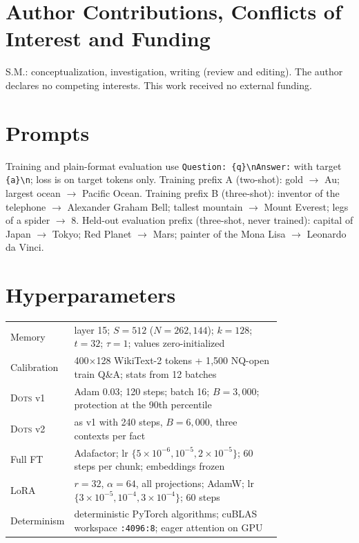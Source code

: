 \documentclass[11pt]{article}
\newcommand{\sys}{\textsc{Dots}}
\begin{document}
\section*{Author Contributions, Conflicts of Interest and Funding}
S.M.: conceptualization, investigation, writing (review and editing). The author declares no competing interests. This work received no external funding.




\appendix
\section{Prompts}
\label{app:prompts}
Training and plain-format evaluation use \texttt{Question: \{q\}\textbackslash nAnswer:} with target \texttt{ \{a\}\textbackslash n}; loss is on target tokens only.
Training prefix A (two-shot): gold $\rightarrow$ Au; largest ocean $\rightarrow$ Pacific Ocean.
Training prefix B (three-shot): inventor of the telephone $\rightarrow$ Alexander Graham Bell; tallest mountain $\rightarrow$ Mount Everest; legs of a spider $\rightarrow$ 8.
Held-out evaluation prefix (three-shot, never trained): capital of Japan $\rightarrow$ Tokyo; Red Planet $\rightarrow$ Mars; painter of the Mona Lisa $\rightarrow$ Leonardo da Vinci.

\section{Hyperparameters}
\noindent\begin{tabular}{@{}lp{0.78\linewidth}@{}}
\toprule
Memory & layer 15; $S=512$ ($N=262{,}144$); $k=128$; $t=32$; $\tau=1$; values zero-initialized \\
Calibration & 400$\times$128 WikiText-2 tokens + 1{,}500 NQ-open train Q\&A; stats from 12 batches \\
\sys{} v1 & Adam 0.03; 120 steps; batch 16; $B=3{,}000$; protection at the 90th percentile \\
\sys{} v2 & as v1 with 240 steps, $B=6{,}000$, three contexts per fact \\
Full FT & Adafactor; lr $\{5\!\times\!10^{-6}, 10^{-5}, 2\!\times\!10^{-5}\}$; 60 steps per chunk; embeddings frozen \\
LoRA & $r=32$, $\alpha=64$, all projections; AdamW; lr $\{3\!\times\!10^{-5}, 10^{-4}, 3\!\times\!10^{-4}\}$; 60 steps \\
Determinism & deterministic PyTorch algorithms; cuBLAS workspace \texttt{:4096:8}; eager attention on GPU \\
\bottomrule
\end{tabular}
\end{document}
